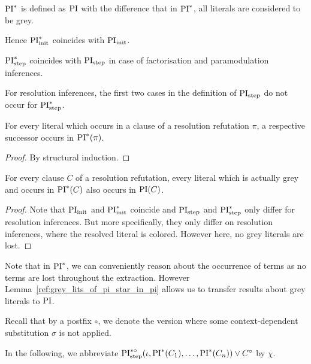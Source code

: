 \documentclass[,%
	draft=false,%
	numbers=noendperiod
	12pt,
	a4paper,
	oneside,%
	openany,
]{memoir}
\newcommand{\inv}{\ensuremath{\chi}}
\begin{document}
\begin{defi}[$\PI^*$]
	$\PI^*$ is defined as $\operatorname{PI}$ with the difference that in $\PI^*$, all literals are considered to be grey.
\end{defi}

Hence $\operatorname{PI}_{\mathrm{init}}^*$ coincides with $\operatorname{PI}_{\mathrm{init}}$.

$\operatorname{PI}_{\mathrm{step}}^*$ coincides with $\operatorname{PI}_{\mathrm{step}}$ in case of factorisation and paramodulation inferences.

For resolution inferences, the first two cases in the definition of $\operatorname{PI}_{\mathrm{step}}$ do not occur for $\operatorname{PI}_{\mathrm{step}}^*$.

\begin{prop}
	For every literal which occurs in a clause of a resolution refutation $\pi$, a respective successor occurs in $\operatorname{PI}^*(\pi)$.
\end{prop}
\begin{proof}
	By structural induction.
\end{proof}

\begin{lemma}
	\label{ref:grey_lits_of_pi_star_in_pi}
	For every clause $C$ of a resolution refutation,
	every literal which is actually grey and occurs in $\operatorname{PI}^*(C)$ also occurs in $\operatorname{PI}(C)$.
\end{lemma}
\begin{proof}
	Note that $\operatorname{PI}_{\mathrm{init}}$ and $\operatorname{PI}_{\mathrm{init}}^*$ coincide and $\operatorname{PI}_{\mathrm{step}}$ and $\operatorname{PI}_{\mathrm{step}}^*$ only differ for resolution inferences.
	But more specifically, they only differ on resolution inferences, where the resolved literal is colored. However here, no grey literals are lost.
\end{proof}

Note that in $\PI^*$, we can conveniently reason about the occurrence of terms as no terms are lost throughout the extraction.
However Lemma~\ref{ref:grey_lits_of_pi_star_in_pi} allows us to transfer results about grey literals to $\operatorname{PI}$.

Recall that by a postfix $\circ$, we denote the version where some context-dependent substitution $\sigma$ is not applied.

In the following, we abbreviate $\operatorname{PI}^{*\circ}_{\mathrm{step}}(\iota, \operatorname{PI}^*(C_1), \dots, \operatorname{PI}^*(C_n)) \lor C^\circ$ by $\inv$.
\end{document}

